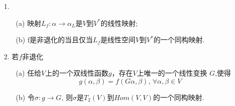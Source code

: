 \begin{itemize}
    \item[1.] 
    \begin{itemize}
        \item [(a)] 映射$L_f: \alpha \rightarrow \alpha_L$是$V$到$V^*$的线性映射;
        \vspace{1cm}


        \item [(b)] f是非退化的当且仅当$L_f$是线性空间$V$到$V^*$的一个同构映射.
        \vspace{2cm}

        

    \end{itemize}
    \item[2.] 若$f$非退化
    \begin{itemize}
        \item [(a)] 任给$V$上的一个双线性函数$g$，存在$V$上唯一的一个线性变换
        $G$,使得$$g(\alpha, \beta) = f(G\alpha, \beta),\, \forall \alpha,\beta \in V$$
        \vspace{3cm}


        \item [(b)] 令$\sigma: g\rightarrow G$, 则$\sigma$是$T_2(V)$到$Hom(V,V)$的一个同构映射.
        \vspace{2cm}
        

\end{itemize}
\end{itemize}

